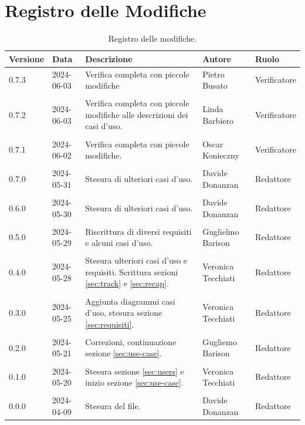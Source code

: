 \documentclass[8pt]{article}
\begin{document}
\section*{Registro delle Modifiche}
\begin{table}[ht!]
\hypersetup{hidelinks}
	\centering
	\begin{tabular}{p{1.2cm} p{2cm} p{6cm} p{3cm} p{2cm}}
		\toprule
		\textbf{Versione}& \textbf{Data} & \textbf{Descrizione} & \textbf{Autore} & \textbf{Ruolo} \\
		\midrule
            0.7.3 & 2024-06-03 & Verifica completa con piccole modifiche & Pietro Busato & Verificatore \\\\
            0.7.2 & 2024-06-03 & Verifica completa con piccole modifiche alle descrizioni dei casi d'uso. & Linda Barbiero & Verificatore \\\\
            0.7.1 & 2024-06-02 & Verifica completa con piccole modifiche. & Oscar Konieczny & Verificatore \\\\
         	0.7.0 & 2024-05-31 & Stesura di ulteriori casi d'uso. & Davide Donanzan & Redattore \\\\
         	0.6.0 & 2024-05-30 & Stesura di ulteriori casi d'uso. & Davide Donanzan & Redattore \\\\
         	0.5.0 & 2024-05-29 & Riscrittura di diversi requisiti e alcuni casi d'uso. & Guglielmo Barison & Redattore \\\\
            0.4.0 & 2024-05-28 & Stesura ulteriori casi d'uso e requisiti. Scrittura sezioni \ref{sec:track} e \ref{sec:recap}. & Veronica Tecchiati & Redattore \\\\
            0.3.0 & 2024-05-25 & Aggiunta diagrammi casi d'uso, stesura sezione \ref{sec:requisiti}. & Veronica Tecchiati & Redattore \\\\
            0.2.0 & 2024-05-21 & Correzioni, continuazione sezione \ref{sec:use-case}. & Gugliemo Barison & Redattore \\\\
            0.1.0 & 2024-05-20 & Stesura sezione \ref{sec:users} e inizio sezione \ref{sec:use-case}. & Veronica Tecchiati & Redattore \\\\
		    0.0.0 & 2024-04-09 & Stesura del file. & Davide Donanzan & Redattore \\
		\bottomrule
	\end{tabular}
	\caption{Registro delle modifiche.}
	\label{table:Registro delle modifiche}
\end{table}
\newpage
{\hypersetup{hidelinks} \tableofcontents}
\clearpage
\newpage
{\hypersetup{hidelinks} \listoffigures}
\newpage
{\hypersetup{hidelinks} \listoftables}
\newpage
\justifying
\end{document}
